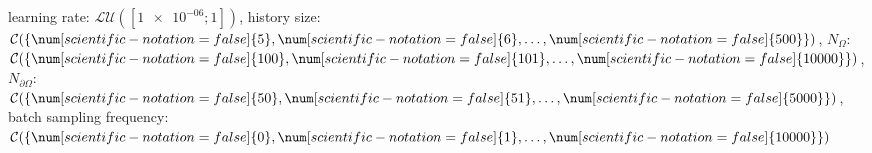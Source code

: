 learning rate: $\mathcal{LU}([\num[scientific-notation=true]{1e-06}; \num[scientific-notation=false]{1}])$, history size: $\mathcal{C}(\{\num[scientific-notation=false]{5},\num[scientific-notation=false]{6},\text{\dots},\num[scientific-notation=false]{500}\})$, $N_{\Omega}$: $\mathcal{C}(\{\num[scientific-notation=false]{100},\num[scientific-notation=false]{101},\text{\dots},\num[scientific-notation=false]{10000}\})$, $N_{\partial\Omega}$: $\mathcal{C}(\{\num[scientific-notation=false]{50},\num[scientific-notation=false]{51},\text{\dots},\num[scientific-notation=false]{5000}\})$, batch sampling frequency: $\mathcal{C}(\{\num[scientific-notation=false]{0},\num[scientific-notation=false]{1},\text{\dots},\num[scientific-notation=false]{10000}\})$